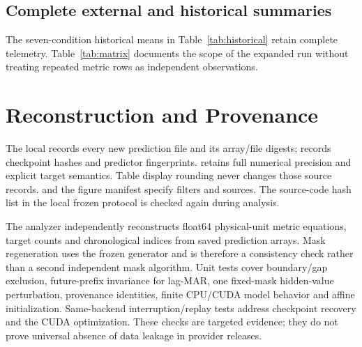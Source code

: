 \subsection{Complete external and historical summaries}
\begin{table}[!t]
\caption{Exploratory Alibaba transfer: six original positive-loss conditions. Absolute MAE/RMSE use the provider's normalized utilization for both resources. They must not be read as CPU cores or memory bytes.}\label{tab:external}
\centering\footnotesize
\FitTable{}
\end{table}
The seven-condition historical means in Table~\ref{tab:historical} retain complete telemetry. Table~\ref{tab:matrix} documents the scope of the expanded run without treating repeated metric rows as independent observations.
\begin{table}[!t]
\caption{Preserved historical cohort: MASE averaged over all seven original conditions, including complete telemetry. These means have a different condition scope from the new primary positive-loss endpoint. V2 is a validation-selected alias of existing compact fits. Extreme GinAR values remain visible and characterize this implementation/protocol, not a canonical-model refutation.}\label{tab:historical}
\centering\footnotesize
\FitTable{}
\end{table}
\begin{table}[!t]
\caption{Executed metric matrix. Rows count repeated service summaries across models, seeds, masks and conditions. They are not independent datasets.}\label{tab:matrix}
\centering\footnotesize
\FitTable{}
\end{table}

\section{Reconstruction and Provenance}
The local  records every new prediction file and its array/file digests;  records checkpoint hashes and predictor fingerprints.  retains full numerical precision and explicit target semantics. Table display rounding never changes those source records.  and the figure manifest specify filters and sources. The source-code hash list in the local frozen protocol is checked again during analysis.

The analyzer independently reconstructs float64 physical-unit metric equations, target counts and chronological indices from saved prediction arrays. Mask regeneration uses the frozen generator and is therefore a consistency check rather than a second independent mask algorithm. Unit tests cover boundary/gap exclusion, future-prefix invariance for lag-MAR, one fixed-mask hidden-value perturbation, provenance identities, finite CPU/CUDA model behavior and affine initialization. Same-backend interruption/replay tests address checkpoint recovery and the CUDA optimization. These checks are targeted evidence; they do not prove universal absence of data leakage in provider releases.

